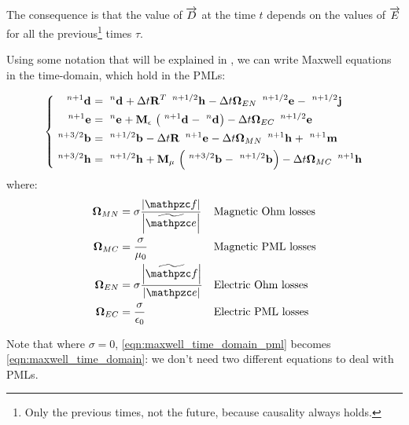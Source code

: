 The consequence is that the value of $\D$ at the time $t$ depends on
the values of $\E$ for all the previous\footnote{Only the previous times,
  not the future, because causality always holds.} times $\tau$.

Using some notation that will be explained in
, we can write Maxwell equations in the
time-domain, which hold in the PMLs:

\begin{equation} \label{eqn:maxwell_time_domain_pml} \left\{ \begin{aligned} 
  \Disc{\Array{d}}{}{n+1} & = \Disc{\Array{d}}{}{n} + \deltat
  \Prod{\Transpose{\Matrix{R}}}{\Disc{\Array{h}}{}{n+1/2}} -
  \deltat \Prod{\Matrix{\Omega}_{EN}}{\Disc{\Array{e}}{}{n+1/2}} -
  \Disc{\Array{j}}{}{n+1/2} \\
  \Disc{\Array{e}}{}{n+1} & = \Disc{\Array{e}}{}{n} +
  \Prod{\Matrix{M}_\epsilon}{\left(\Disc{\Array{d}}{}{n+1} -
  \Disc{\Array{d}}{}{n}\right)} - \deltat
  \Prod{\Matrix{\Omega}_{EC}}{\Disc{\Array{e}}{}{n+1/2}} \\
  \Disc{\Array{b}}{}{n+3/2} & = \Disc{\Array{b}}{}{n+1/2} - \deltat
  \Prod{\Matrix{R}}{\Disc{\Array{e}}{}{n+1}} - \deltat
  \Prod{\Matrix{\Omega}_{MN}}{\Disc{\Array{h}}{}{n+1}} + \Disc{\Array{m}}{}{n+1} \\
  \Disc{\Array{h}}{}{n+3/2} & = \Disc{\Array{h}}{}{n+1/2} +
  \Prod{\Matrix{M}_\mu}{\left(\Disc{\Array{b}}{}{n+3/2} -
  \Disc{\Array{b}}{}{n+1/2} \right)} - \deltat
  \Prod{\Matrix{\Omega}_{MC}}{\Disc{\Array{h}}{}{n+1}}
\end{aligned} \right. \end{equation}
where:
\begin{align*}
  \Matrix{\Omega}_{MN} & = \sigma \frac{\Measure{\Surface{f}}}{\Measure{\DualLine{e}}} &&
  \text{Magnetic Ohm losses} \\
  \Matrix{\Omega}_{MC} & = \frac{\sigma}{\mu_0}  &&
  \text{Magnetic PML losses} \\
  \Matrix{\Omega}_{EN} & = \sigma \frac{\Measure{\DualSurface{f}}}{\Measure{\Line{e}}}  &&
  \text{Electric Ohm losses} \\
  \Matrix{\Omega}_{EC} & = \frac{\sigma}{\epsilon_0} &&
  \text{Electric PML losses} 
\end{align*}

Note that where $\sigma = 0$, \eqref{eqn:maxwell_time_domain_pml}
becomes \eqref{eqn:maxwell_time_domain}: we don't need two different
equations to deal with PMLs.





